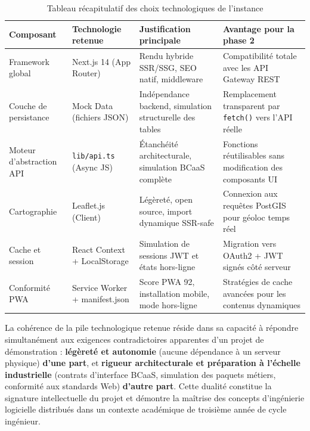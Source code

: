 \documentclass[12pt,a4paper]{report}
\newcommand{\tableheader}[1]{%
  \cellcolor{HeaderBg}\textbf{\color{white}#1}}
\begin{document}
\vspace{0.5em}
\begin{table}[H]
\centering
\caption{Tableau récapitulatif des choix technologiques de l'instance}
\label{tab:techno}
\renewcommand{\arraystretch}{1.6}
\small
\begin{tabular}{>{\raggedright\arraybackslash}p{3.2cm}
                >{\raggedright\arraybackslash}p{3.5cm}
                >{\raggedright\arraybackslash}p{3.2cm}
                >{\raggedright\arraybackslash}p{3.2cm}}
\toprule
\tableheader{Composant} &
\tableheader{Technologie retenue} &
\tableheader{Justification principale} &
\tableheader{Avantage pour la phase 2} \\
\midrule
\rowcolor{PBCLightGray}
Framework global & Next.js 14 (App Router) & Rendu hybride SSR/SSG, SEO natif, middleware & Compatibilité totale avec les API Gateway REST \\
Couche de persistance & Mock Data (fichiers JSON) & Indépendance backend, simulation structurelle des tables & Remplacement transparent par \texttt{fetch()} vers l'API réelle \\
\rowcolor{PBCLightGray}
Moteur d'abstraction API & \texttt{lib/api.ts} (Async JS) & Étanchéité architecturale, simulation BCaaS complète & Fonctions réutilisables sans modification des composants UI \\
Cartographie & Leaflet.js (Client) & Légèreté, open source, import dynamique SSR-safe & Connexion aux requêtes PostGIS pour géoloc temps réel \\
\rowcolor{PBCLightGray}
Cache et session & React Context + LocalStorage & Simulation de sessions JWT et états hors-ligne & Migration vers OAuth2 + JWT signés côté serveur \\
Conformité PWA & Service Worker + manifest.json & Score PWA 92, installation mobile, mode hors-ligne & Stratégies de cache avancées pour les contenus dynamiques \\
\bottomrule
\end{tabular}
\end{table}

\begin{insightbox}
La cohérence de la pile technologique retenue réside dans sa capacité à répondre simultanément aux exigences contradictoires apparentes d'un projet de démonstration : \textbf{légèreté et autonomie} (aucune dépendance à un serveur physique) \textbf{d'une part}, et \textbf{rigueur architecturale et préparation à l'échelle industrielle} (contrats d'interface BCaaS, simulation des paquets métiers, conformité aux standards Web) \textbf{d'autre part}. Cette dualité constitue la signature intellectuelle du projet et démontre la maîtrise des concepts d'ingénierie logicielle distribués dans un contexte académique de troisième année de cycle ingénieur.
\end{insightbox}
\end{document}
